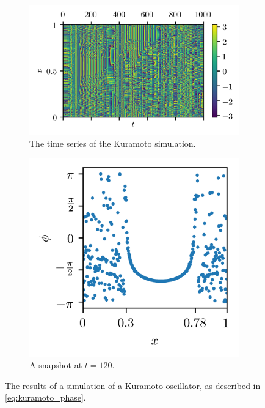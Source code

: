 \begin{figure}[ht]
  \centering
  \begin{subfigure}{0.6\textwidth}
    \centering
    \includegraphics{figure/kuramoto_overhead}
    \caption{The time series of the Kuramoto simulation.}
    \label{fig:kuramoto_overhead}
  \end{subfigure} %
  \begin{subfigure}{0.3\textwidth}
    \centering
    \includegraphics{figure/kuramoto_snapshot}
    \caption{A snapshot at $t = 120$.}
    \label{fig:kuramoto_snapshot}
  \end{subfigure}
  \caption[Kuramoto simulation]{The results of a simulation of a Kuramoto oscillator, as described in \cref{eq:kuramoto_phase}.
}
\end{figure}
